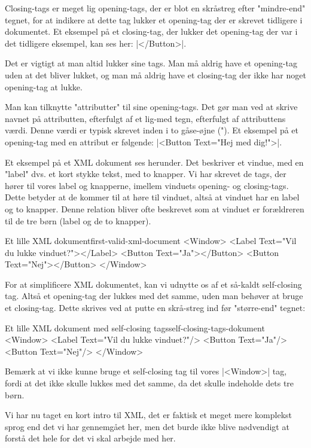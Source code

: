 Closing-tags er meget lig opening-tags, der er blot en skråstreg efter "mindre-end" tegnet, for at indikere at dette tag lukker et opening-tag der er skrevet tidligere i dokumentet. Et eksempel på et closing-tag, der lukker det opening-tag der var i det tidligere eksempel, kan ses her: \XmlInline|</Button>|.

Det er vigtigt at man altid lukker sine tags. Man må aldrig have et opening-tag uden at det bliver lukket, og man må aldrig have et closing-tag der ikke har noget opening-tag at lukke.

Man kan tilknytte "attributter" til sine opening-tags. Det gør man ved at skrive navnet på attributten, efterfulgt af et lig-med tegn, efterfulgt af attributtens værdi. Denne værdi er typisk skrevet inden i to gåse-øjne ("). Et eksempel på et opening-tag med en attribut er følgende: \XmlInline|<Button Text="Hej med dig!">|.

Et eksempel på et XML dokument ses herunder. Det beskriver et vindue, med en "label" dvs. et kort stykke tekst, med to knapper. Vi har skrevet de tags, der hører til vores label og knapperne, imellem vinduets opening- og closing-tags. Dette betyder at de kommer til at høre til vinduet, altså at vinduet har en label og to knapper. Denne relation bliver ofte beskrevet som at vinduet er forældreren til de tre børn (label og de to knapper).
\begin{XmlCode}{Et lille XML dokument}{first-valid-xml-document}
	<Window>
		<Label Text="Vil du lukke vinduet?"></Label>
		<Button Text="Ja"></Button>
		<Button Text="Nej"></Button>
	</Window>
\end{XmlCode}

For at simplificere XML dokumentet, kan vi udnytte os af et så-kaldt self-closing tag. Altså et opening-tag der lukkes med det samme, uden man behøver at bruge et closing-tag. Dette skrives ved at putte en skrå-streg ind før "større-end" tegnet:

\begin{XmlCode}{Et lille XML dokument med self-closing tags}{self-closing-tags-dokument}
	<Window>
		<Label Text="Vil du lukke vinduet?"/>
		<Button Text="Ja"/>
		<Button Text="Nej"/>
	</Window>
\end{XmlCode}

Bemærk at vi ikke kunne bruge et self-closing tag til vores \XmlInline|<Window>| tag, fordi at det ikke skulle lukkes med det samme, da det skulle indeholde dets tre børn.

Vi har nu taget en kort intro til XML, det er faktisk et meget mere komplekst sprog end det vi har gennemgået her, men det burde ikke blive nødvendigt at forstå det hele for det vi skal arbejde med her.

